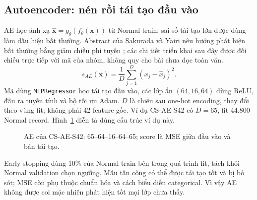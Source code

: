 \subsection{Autoencoder: nén rồi tái tạo đầu vào}
AE học ánh xạ $\hat{\mathbf{x}}=g_\theta(f_\theta(\mathbf{x}))$ từ Normal train; sai số tái tạo lớn được dùng làm dấu hiệu bất thường. Abstract của Sakurada và Yairi nêu hướng phát hiện bất thường bằng giảm chiều phi tuyến \cite{sakurada2014}; các chi tiết triển khai sau đây được đối chiếu trực tiếp với mã của nhóm, không quy cho bài chưa đọc toàn văn.
\begin{equation}
s_{AE}(\mathbf{x})=\frac{1}{D}\sum_{j=1}^{D}(x_j-\hat{x}_j)^2.
\end{equation}
Mã dùng \texttt{MLPRegressor} học tái tạo đầu vào, các lớp ẩn $(64,16,64)$ dùng ReLU, đầu ra tuyến tính và bộ tối ưu Adam. $D$ là chiều sau one-hot encoding, thay đổi theo vùng fit; không phải 42 feature gốc. Ví dụ CS-AE-S42 có $D=65$, fit 44.800 Normal record. Hình~\ref{fig:ae} diễn tả đúng cấu trúc ví dụ này.
\begin{figure}[H]\centering
{}
\caption[Cấu trúc Autoencoder CS-AE-S42]{AE của CS-AE-S42: 65--64--16--64--65; score là MSE giữa đầu vào và bản tái tạo.}\label{fig:ae}
\end{figure}
Early stopping dùng 10\% của Normal train bên trong quá trình fit, tách khỏi Normal validation chọn ngưỡng. Mẫu tấn công có thể được tái tạo tốt và bị bỏ sót; MSE còn phụ thuộc chuẩn hóa và cách biểu diễn categorical. Vì vậy AE không được coi mặc nhiên phát hiện tốt mọi lớp chưa thấy.
